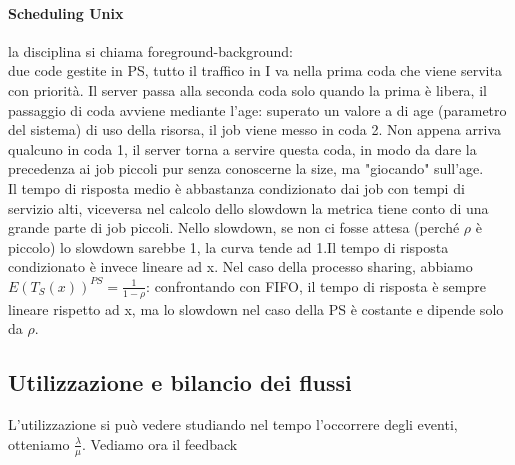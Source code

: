 \documentclass{article}
\begin{document}
\paragraph{Scheduling Unix}la disciplina si chiama foreground-background:\\
due code gestite in PS, tutto il traffico in I va nella prima coda che viene servita con priorità. Il server passa alla seconda coda solo quando la prima è libera, il passaggio di coda avviene mediante l'age: superato un valore a di age (parametro del sistema) di uso della risorsa, il job viene messo in coda 2. Non appena arriva qualcuno in coda 1, il server torna a servire questa coda, in modo da dare la precedenza ai job piccoli pur senza conoscerne la size, ma "giocando" sull'age.\\
Il tempo di risposta medio è abbastanza condizionato dai job con tempi di servizio alti, viceversa nel calcolo dello slowdown la metrica tiene conto di una grande parte di job piccoli. Nello slowdown, se non ci fosse attesa (perché $\rho$ è piccolo) lo slowdown sarebbe 1, la curva tende ad 1.Il tempo di risposta condizionato è invece lineare ad x. Nel caso della processo sharing, abbiamo $E(T_S(x))^{PS} = \frac{1}{1 - \rho}$: confrontando con FIFO, il tempo di risposta è sempre lineare rispetto ad x, ma lo slowdown nel caso della PS è costante e dipende solo da $\rho$.
\subsection{Utilizzazione e bilancio dei flussi}
L'utilizzazione si può vedere studiando nel tempo l'occorrere degli eventi, otteniamo $\frac{\lambda}{\mu}$. Vediamo ora il feedback
\end{document}
